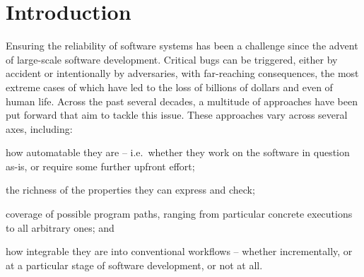 \documentclass[withindex,glossary]{cam-thesis}
\newcommand\TODO[1]{}
\newcommand\TODO[1]{{\color{violet}TODO: #1}}
\begin{document}
\chapter{Introduction}

Ensuring the reliability of software systems has been a challenge since the advent of large-scale software development.
%
Critical bugs can be triggered, either by accident or intentionally by adversaries, with far-reaching consequences, the most extreme cases of which have led to the loss of billions of dollars and even of human life.
Across the past several decades, a multitude of approaches have been put forward that aim to tackle this issue.
%
These approaches vary across several axes, including:
\begin{enumerate*}[label=(\arabic*)]
\item how automatable they are -- i.e.~whether they work on the software in question as-is\TODO{Implicit assumption of code-first? well, you need some software to check, right...}, or require some further upfront effort; 
\item the richness of the properties they can express and check; 
\item coverage of possible program paths, ranging from particular concrete executions to all arbitrary ones\TODO{This is just level of assurance, right?}; and
\item how integrable they are into conventional workflows -- whether incrementally, or at a particular stage of software development, or not at all.
\end{enumerate*}

\TODO{PS 15/07: Might want to enumerate all possible axes in text, in intro (with subtitles, subsections, etc). Banerjee's hypercube\dots and take the top 15-20 tools you know and try to place them in the hypercube. You could make it a 3D cube if one of the axes can be sort-of squashed onto another. E.g.~2 and 3?!}

\TODO{NK 15/07: Hypercube is useful for understanding the space and the hole I am trying to fill.}
\end{document}
